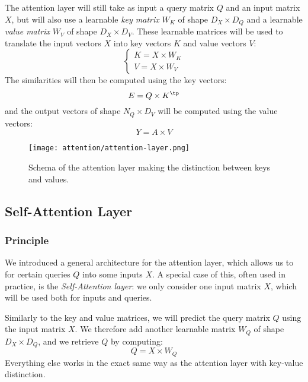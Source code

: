 The attention layer will still take as input a query matrix $Q$ and an input matrix $X$, but will also use a learnable \emph{key matrix} $W_K$ of shape $D_X\times D_Q$ and a learnable \emph{value matrix} $W_V$ of shape $D_X\times D_V$. These learnable matrices will be used to translate the input vectors $X$ into key vectors $K$ and value vectors $V$:
\begin{equation*}
    \begin{cases}
        K = X\times W_K\\
        V = X\times W_V
    \end{cases}
\end{equation*}
The similarities will then be computed using the key vectors:
\begin{equation*}
    E = Q\times K^\tp
\end{equation*}
and the output vectors of shape $N_Q\times D_V$ will be computed using the value vectors:
\begin{equation*}
    Y = A\times V
\end{equation*}

\begin{figure}[H]
    \centering
    \texttt{[image: attention/attention-layer.png]}
    \caption{Schema of the attention layer making the distinction between keys and values.}
\end{figure}


\subsection{Self-Attention Layer}
\subsubsection{Principle}
We introduced a general architecture for the attention layer, which allows us to  for certain queries $Q$ into some inputs $X$. A special case of this, often used in practice, is the \emph{Self-Attention layer}: we only consider one input matrix $X$, which will be used both for inputs and queries.

Similarly to the key and value matrices, we will predict the query matrix $Q$ using the input matrix $X$. We therefore add another learnable matrix $W_Q$ of shape $D_X\times D_Q$, and we retrieve $Q$ by computing:
\begin{equation*}
    Q = X\times W_Q
\end{equation*}
Everything else works in the exact same way as the attention layer with key-value distinction.

